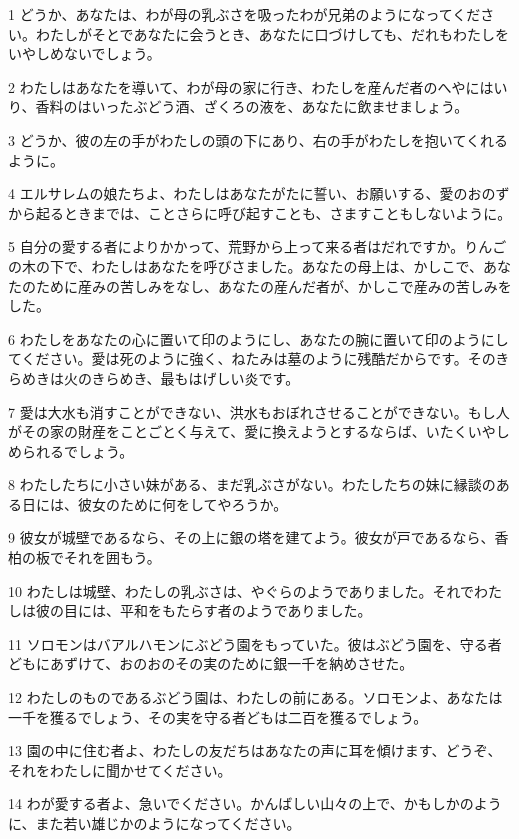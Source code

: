 \par 1 どうか、あなたは、わが母の乳ぶさを吸ったわが兄弟のようになってください。わたしがそとであなたに会うとき、あなたに口づけしても、だれもわたしをいやしめないでしょう。
\par 2 わたしはあなたを導いて、わが母の家に行き、わたしを産んだ者のへやにはいり、香料のはいったぶどう酒、ざくろの液を、あなたに飲ませましょう。
\par 3 どうか、彼の左の手がわたしの頭の下にあり、右の手がわたしを抱いてくれるように。
\par 4 エルサレムの娘たちよ、わたしはあなたがたに誓い、お願いする、愛のおのずから起るときまでは、ことさらに呼び起すことも、さますこともしないように。
\par 5 自分の愛する者によりかかって、荒野から上って来る者はだれですか。りんごの木の下で、わたしはあなたを呼びさました。あなたの母上は、かしこで、あなたのために産みの苦しみをなし、あなたの産んだ者が、かしこで産みの苦しみをした。
\par 6 わたしをあなたの心に置いて印のようにし、あなたの腕に置いて印のようにしてください。愛は死のように強く、ねたみは墓のように残酷だからです。そのきらめきは火のきらめき、最もはげしい炎です。
\par 7 愛は大水も消すことができない、洪水もおぼれさせることができない。もし人がその家の財産をことごとく与えて、愛に換えようとするならば、いたくいやしめられるでしょう。
\par 8 わたしたちに小さい妹がある、まだ乳ぶさがない。わたしたちの妹に縁談のある日には、彼女のために何をしてやろうか。
\par 9 彼女が城壁であるなら、その上に銀の塔を建てよう。彼女が戸であるなら、香柏の板でそれを囲もう。
\par 10 わたしは城壁、わたしの乳ぶさは、やぐらのようでありました。それでわたしは彼の目には、平和をもたらす者のようでありました。
\par 11 ソロモンはバアルハモンにぶどう園をもっていた。彼はぶどう園を、守る者どもにあずけて、おのおのその実のために銀一千を納めさせた。
\par 12 わたしのものであるぶどう園は、わたしの前にある。ソロモンよ、あなたは一千を獲るでしょう、その実を守る者どもは二百を獲るでしょう。
\par 13 園の中に住む者よ、わたしの友だちはあなたの声に耳を傾けます、どうぞ、それをわたしに聞かせてください。
\par 14 わが愛する者よ、急いでください。かんばしい山々の上で、かもしかのように、また若い雄じかのようになってください。


